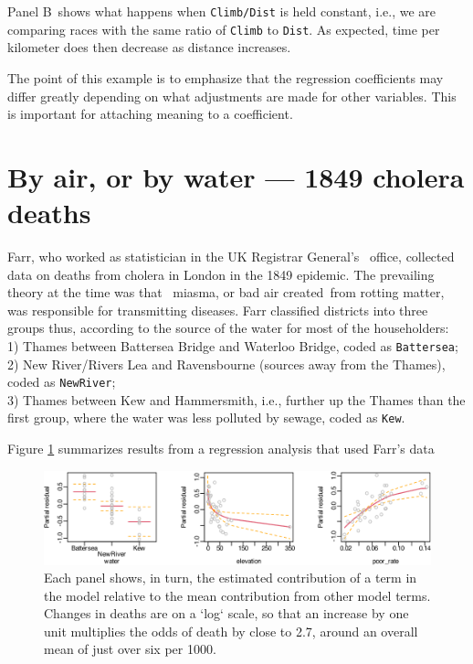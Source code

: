 \documentclass[
  10pt,
  b5paper]{book}
\begin{document}
Panel B~shows what happens when \texttt{Climb/Dist} is held
constant, i.e., we are comparing races with the same ratio of
\texttt{Climb} to \texttt{Dist}. As expected, time per kilometer does then
decrease as distance increases.

The point of this example is to emphasize that the regression
coefficients may differ greatly depending on what adjustments
are made for other variables. This is important for attaching
meaning to a coefficient.

\hypertarget{by-air-or-by-water-1849-cholera-deaths}{%
\section{By air, or by water --- 1849 cholera deaths}\label{by-air-or-by-water-1849-cholera-deaths}}

Farr, who worked as statistician in the UK Registrar General's~
office, collected data on deaths from cholera in London in the
1849 epidemic. The prevailing theory at the time was that~
miasma, or bad air created~from rotting matter, was responsible
for transmitting diseases.
Farr classified districts into three groups thus, according
to the source of the water for most of the householders:\\
1) Thames between Battersea Bridge and Waterloo Bridge, coded
as \texttt{Battersea};\\
2) New River/Rivers Lea and Ravensbourne (sources away from
the Thames), coded as \texttt{NewRiver};\\
3) Thames between Kew and Hammersmith, i.e., further up the
Thames than the first group, where the water was less polluted
by sewage, coded as \texttt{Kew}.

Figure \ref{fig:Farr} summarizes results from a regression analysis
that used Farr's data

\begin{figure}

{\centering \includegraphics[width=1\linewidth]{08-observational_files/figure-latex/Farr-1} 

}

\caption{Each panel shows, in turn, the estimated contribution
of a term in the model relative to the mean contribution from other 
model terms. Changes in deaths are on a `log` scale, so that an 
increase by one unit multiplies the odds of death by close to 2.7, 
around an overall mean of just over six per 1000.
}\label{fig:Farr}
\end{figure}
\end{document}
